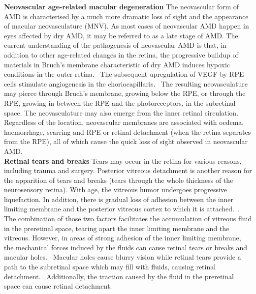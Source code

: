 \documentclass[12pt,a4paper]{journal}
\begin{document}
\textbf{Neovascular age-related macular degeneration}
The neovascular form of AMD is characterised by a much more dramatic loss of sight and the appearance of macular neovasculature (MNV).
As most cases of neovascular AMD happen in eyes affected by dry AMD, it may be referred to as a late stage of AMD.
The current understanding of the pathogenesis of neovascular AMD is that, in addition to other age-related changes in the retina, the progressive buildup of materials in Bruch's membrane characteristic of dry AMD induces hypoxic conditions in the outer retina.~\cite{Jager_2008,Newsom_2008}
The subsequent upregulation of VEGF by RPE cells stimulate angiogenesis in the choriocapillaris.~\cite{Jager_2008}
The resulting neovasculature may pierce through Bruch's membrane, growing below the RPE, or through the RPE, growing in between the RPE and the photoreceptors, in the subretinal space.
The neovasculature may also emerge from the inner retinal circulation.
Regardless of the location, neovascular membranes are associated with oedema, haemorrhage, scarring and RPE or retinal detachment (when the retina separates from the RPE), all of which cause the quick loss of sight observed in neovascular AMD.~\cite{Gupta_2015,Jager_2008}\\

\textbf{Retinal tears and breaks}
Tears may occur in the retina for various reasons, including trauma and surgery.
Posterior vitreous detachment is another reason for the apparition of tears and breaks (tears through the whole thickness of the neurosensory retina).
With age, the vitreous humor undergoes progressive liquefaction.
In addition, there is gradual loss of adhesion between the inner limiting membrane and the posterior vitreous cortex to which it is attached.~\cite{Bottos_2012,Medina_2016}.
The combination of those two factors facilitates the accumulation of vitreous fluid in the preretinal space, tearing apart the inner limiting membrane and the vitreous.
However, in areas of strong adhesion of the inner limiting membrane, the mechanical forces induced by the fluids can cause retinal tears or breaks and macular holes.~\cite{Shechtman_2009}
Macular holes cause blurry vision while retinal tears provide a path to the subretinal space which may fill with fluids, causing retinal detachment.~\cite{Medina_2016}
Additionally, the traction caused by the fluid in the preretinal space can cause retinal detachment.\\
\end{document}

